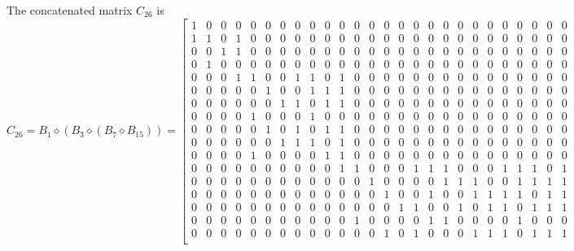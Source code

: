 \documentclass[11pt]{article}
\begin{document}
\begin{appendices}
The concatenated matrix $C_{26}$ is 
$$C_{26}=
B_1\diamond (B_3\diamond (B_7\diamond B_{15})) = 
\left[\begin{smallmatrix}
    1 & 0 & 0 & 0 & 0 & 0 & 0 & 0 & 0 & 0 & 0 & 0 & 0 & 0 & 0 & 0 & 0 & 0 & 0 & 0 & 0 & 0 & 0 & 0 & 0 & 0 \\ 
    1 & 1 & 0 & 1 & 0 & 0 & 0 & 0 & 0 & 0 & 0 & 0 & 0 & 0 & 0 & 0 & 0 & 0 & 0 & 0 & 0 & 0 & 0 & 0 & 0 & 0 \\ 
    0 & 0 & 1 & 1 & 0 & 0 & 0 & 0 & 0 & 0 & 0 & 0 & 0 & 0 & 0 & 0 & 0 & 0 & 0 & 0 & 0 & 0 & 0 & 0 & 0 & 0 \\ 
    0 & 1 & 0 & 0 & 0 & 0 & 0 & 0 & 0 & 0 & 0 & 0 & 0 & 0 & 0 & 0 & 0 & 0 & 0 & 0 & 0 & 0 & 0 & 0 & 0 & 0 \\ 
    0 & 0 & 0 & 1 & 1 & 0 & 0 & 1 & 1 & 0 & 1 & 0 & 0 & 0 & 0 & 0 & 0 & 0 & 0 & 0 & 0 & 0 & 0 & 0 & 0 & 0 \\ 
    0 & 0 & 0 & 0 & 0 & 1 & 0 & 0 & 1 & 1 & 1 & 0 & 0 & 0 & 0 & 0 & 0 & 0 & 0 & 0 & 0 & 0 & 0 & 0 & 0 & 0 \\ 
    0 & 0 & 0 & 0 & 0 & 0 & 1 & 1 & 0 & 1 & 1 & 0 & 0 & 0 & 0 & 0 & 0 & 0 & 0 & 0 & 0 & 0 & 0 & 0 & 0 & 0 \\ 
    0 & 0 & 0 & 0 & 1 & 0 & 0 & 0 & 1 & 0 & 0 & 0 & 0 & 0 & 0 & 0 & 0 & 0 & 0 & 0 & 0 & 0 & 0 & 0 & 0 & 0 \\ 
    0 & 0 & 0 & 0 & 0 & 1 & 0 & 1 & 0 & 1 & 1 & 0 & 0 & 0 & 0 & 0 & 0 & 0 & 0 & 0 & 0 & 0 & 0 & 0 & 0 & 0 \\ 
    0 & 0 & 0 & 0 & 0 & 0 & 1 & 1 & 1 & 0 & 1 & 0 & 0 & 0 & 0 & 0 & 0 & 0 & 0 & 0 & 0 & 0 & 0 & 0 & 0 & 0 \\ 
    0 & 0 & 0 & 0 & 1 & 0 & 0 & 0 & 0 & 1 & 1 & 0 & 0 & 0 & 0 & 0 & 0 & 0 & 0 & 0 & 0 & 0 & 0 & 0 & 0 & 0 \\ 
    0 & 0 & 0 & 0 & 0 & 0 & 0 & 0 & 0 & 0 & 1 & 1 & 0 & 0 & 0 & 1 & 1 & 1 & 0 & 0 & 0 & 1 & 1 & 1 & 0 & 1 \\ 
    0 & 0 & 0 & 0 & 0 & 0 & 0 & 0 & 0 & 0 & 0 & 0 & 1 & 0 & 0 & 0 & 0 & 1 & 1 & 1 & 0 & 0 & 1 & 1 & 1 & 1 \\ 
    0 & 0 & 0 & 0 & 0 & 0 & 0 & 0 & 0 & 0 & 0 & 0 & 0 & 1 & 0 & 0 & 1 & 0 & 0 & 1 & 1 & 1 & 1 & 0 & 1 & 1 \\ 
    0 & 0 & 0 & 0 & 0 & 0 & 0 & 0 & 0 & 0 & 0 & 0 & 0 & 0 & 1 & 1 & 0 & 0 & 1 & 0 & 1 & 1 & 0 & 1 & 1 & 1 \\ 
    0 & 0 & 0 & 0 & 0 & 0 & 0 & 0 & 0 & 0 & 0 & 1 & 0 & 0 & 0 & 0 & 1 & 1 & 0 & 0 & 0 & 0 & 1 & 0 & 0 & 0 \\ 
    0 & 0 & 0 & 0 & 0 & 0 & 0 & 0 & 0 & 0 & 0 & 0 & 0 & 1 & 0 & 1 & 0 & 0 & 0 & 1 & 1 & 1 & 0 & 1 & 1 & 1 \\ 

\end{smallmatrix}$$
\end{appendices}
\end{document}
